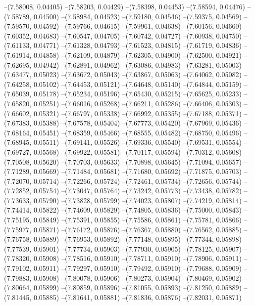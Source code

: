 --(7.58008, 0.04405)
--(7.58203, 0.04429)
--(7.58398, 0.04453)
--(7.58594, 0.04476)
--(7.58789, 0.04500)
--(7.58984, 0.04523)
--(7.59180, 0.04546)
--(7.59375, 0.04569)
--(7.59570, 0.04592)
--(7.59766, 0.04615)
--(7.59961, 0.04638)
--(7.60156, 0.04660)
--(7.60352, 0.04683)
--(7.60547, 0.04705)
--(7.60742, 0.04727)
--(7.60938, 0.04750)
--(7.61133, 0.04771)
--(7.61328, 0.04793)
--(7.61523, 0.04815)
--(7.61719, 0.04836)
--(7.61914, 0.04858)
--(7.62109, 0.04879)
--(7.62305, 0.04900)
--(7.62500, 0.04921)
--(7.62695, 0.04942)
--(7.62891, 0.04962)
--(7.63086, 0.04983)
--(7.63281, 0.05003)
--(7.63477, 0.05023)
--(7.63672, 0.05043)
--(7.63867, 0.05063)
--(7.64062, 0.05082)
--(7.64258, 0.05102)
--(7.64453, 0.05121)
--(7.64648, 0.05140)
--(7.64844, 0.05159)
--(7.65039, 0.05178)
--(7.65234, 0.05196)
--(7.65430, 0.05215)
--(7.65625, 0.05233)
--(7.65820, 0.05251)
--(7.66016, 0.05268)
--(7.66211, 0.05286)
--(7.66406, 0.05303)
--(7.66602, 0.05321)
--(7.66797, 0.05338)
--(7.66992, 0.05355)
--(7.67188, 0.05371)
--(7.67383, 0.05388)
--(7.67578, 0.05404)
--(7.67773, 0.05420)
--(7.67969, 0.05436)
--(7.68164, 0.05451)
--(7.68359, 0.05466)
--(7.68555, 0.05482)
--(7.68750, 0.05496)
--(7.68945, 0.05511)
--(7.69141, 0.05526)
--(7.69336, 0.05540)
--(7.69531, 0.05554)
--(7.69727, 0.05568)
--(7.69922, 0.05581)
--(7.70117, 0.05594)
--(7.70312, 0.05608)
--(7.70508, 0.05620)
--(7.70703, 0.05633)
--(7.70898, 0.05645)
--(7.71094, 0.05657)
--(7.71289, 0.05669)
--(7.71484, 0.05681)
--(7.71680, 0.05692)
--(7.71875, 0.05703)
--(7.72070, 0.05714)
--(7.72266, 0.05724)
--(7.72461, 0.05734)
--(7.72656, 0.05744)
--(7.72852, 0.05754)
--(7.73047, 0.05764)
--(7.73242, 0.05773)
--(7.73438, 0.05782)
--(7.73633, 0.05790)
--(7.73828, 0.05799)
--(7.74023, 0.05807)
--(7.74219, 0.05814)
--(7.74414, 0.05822)
--(7.74609, 0.05829)
--(7.74805, 0.05836)
--(7.75000, 0.05843)
--(7.75195, 0.05849)
--(7.75391, 0.05855)
--(7.75586, 0.05861)
--(7.75781, 0.05866)
--(7.75977, 0.05871)
--(7.76172, 0.05876)
--(7.76367, 0.05880)
--(7.76562, 0.05885)
--(7.76758, 0.05889)
--(7.76953, 0.05892)
--(7.77148, 0.05895)
--(7.77344, 0.05898)
--(7.77539, 0.05901)
--(7.77734, 0.05903)
--(7.77930, 0.05905)
--(7.78125, 0.05907)
--(7.78320, 0.05908)
--(7.78516, 0.05910)
--(7.78711, 0.05910)
--(7.78906, 0.05911)
--(7.79102, 0.05911)
--(7.79297, 0.05910)
--(7.79492, 0.05910)
--(7.79688, 0.05909)
--(7.79883, 0.05908)
--(7.80078, 0.05906)
--(7.80273, 0.05904)
--(7.80469, 0.05902)
--(7.80664, 0.05899)
--(7.80859, 0.05896)
--(7.81055, 0.05893)
--(7.81250, 0.05889)
--(7.81445, 0.05885)
--(7.81641, 0.05881)
--(7.81836, 0.05876)
--(7.82031, 0.05871)

